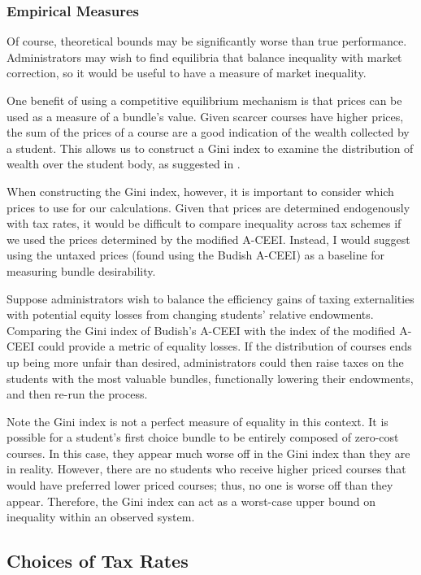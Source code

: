\documentclass{article}
\begin{document}
\subsubsection{Empirical Measures}

Of course, theoretical bounds may be significantly worse than true performance. Administrators may wish to find equilibria that balance inequality with market correction, so it would be useful to have a measure of market inequality. 

One benefit of using a competitive equilibrium mechanism is that prices can be used as a measure of a bundle's value. Given scarcer courses have higher prices, the sum of the prices of a course are a good indication of the wealth collected by a student. This allows us to construct a Gini index to examine the distribution of wealth over the student body, as suggested in \textcite{budish2016}.

When constructing the Gini index, however, it is important to consider which prices to use for our calculations. Given that prices are determined endogenously with tax rates, it would be difficult to compare inequality across tax schemes if we used the prices determined by the modified A-CEEI. Instead, I would suggest using the untaxed prices (found using the Budish A-CEEI) as a baseline for measuring bundle desirability.

Suppose administrators wish to balance the efficiency gains of taxing externalities with potential equity losses from changing students' relative endowments. Comparing the Gini index of Budish's A-CEEI with the index of the modified A-CEEI could provide a metric of equality losses. If the distribution of courses ends up being more unfair than desired, administrators could then raise taxes on the students with the most valuable bundles, functionally lowering their endowments, and then re-run the process.

Note the Gini index is not a perfect measure of equality in this context. It is possible for a student's first choice bundle to be entirely composed of zero-cost courses. In this case, they appear much worse off in the Gini index than they are in reality. However, there are no students who receive higher priced courses that would have preferred lower priced courses; thus, no one is worse off than they appear. Therefore, the Gini index can act as a worst-case upper bound on inequality within an observed system.



\subsection{Choices of Tax Rates}
\label{choices}
\end{document}
